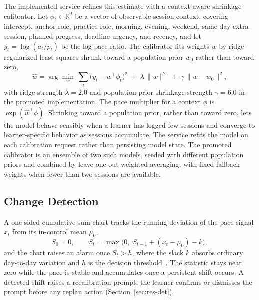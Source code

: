 \documentclass[conference]{IEEEtran}
\begin{document}
The implemented service refines this estimate with a context-aware shrinkage calibrator. Let $\phi_t \in \mathbb{R}^d$ be a vector of observable session context, covering intercept, anchor role, practice role, morning, evening, weekend, same-day extra session, planned progress, deadline urgency, and recency, and let $y_t = \log(a_t/p_t)$ be the log pace ratio. The calibrator fits weights $w$ by ridge-regularized least squares shrunk toward a population prior $w_0$ rather than toward zero,
\begin{equation}
\hat{w} = \arg\min_{w}\ \sum_t \big(y_t - w^{\top}\phi_t\big)^2 \; + \; \lambda\,\lVert w \rVert^2 \; + \; \gamma\,\lVert w - w_0 \rVert^2,
\label{eq:enriched}
\end{equation}
with ridge strength $\lambda=2.0$ and population-prior shrinkage strength $\gamma=6.0$ in the promoted implementation. The pace multiplier for a context $\phi$ is $\exp(\hat{w}^{\top}\phi)$. Shrinking toward a population prior, rather than toward zero, lets the model behave sensibly when a learner has logged few sessions and converge to learner-specific behavior as sessions accumulate. The service refits the model on each calibration request rather than persisting model state. The promoted calibrator is an ensemble of two such models, seeded with different population priors and combined by leave-one-out-weighted averaging, with fixed fallback weights when fewer than two sessions are available.

\subsection{Change Detection}
\label{sec:method-det}
A one-sided cumulative-sum chart tracks the running deviation of the pace signal $x_t$ from its in-control mean $\mu_0$,
\begin{equation}
S_0 = 0, \qquad S_t = \max\!\big(0,\; S_{t-1} + (x_t-\mu_0) - k\big),
\label{eq:cusum}
\end{equation}
and the chart raises an alarm once $S_t > h$, where the slack $k$ absorbs ordinary day-to-day variation and $h$ is the decision threshold~\cite{aminikhanghahi2017}. The statistic stays near zero while the pace is stable and accumulates once a persistent shift occurs. A detected shift raises a recalibration prompt; the learner confirms or dismisses the prompt before any replan action (Section~\ref{sec:res-det}).
\end{document}
